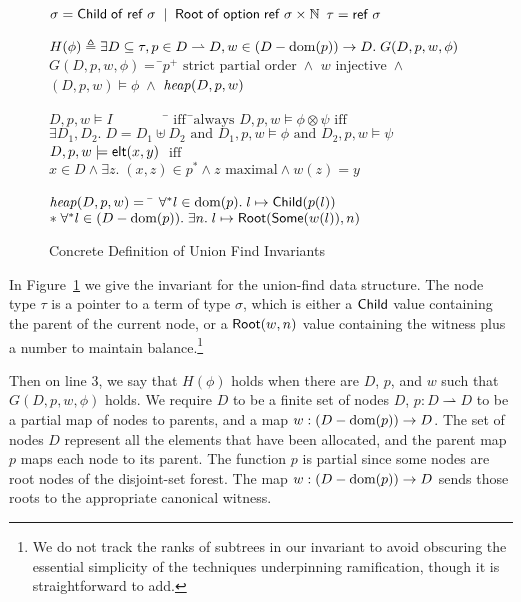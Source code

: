 \begin{figure}
\mbox{}
\begin{specification}
\nextline $\sigma = \mathsf{Child} \;\mathsf{of}\; \mathsf{ref}\;\sigma \;\;|\;\; \mathsf{Root} \;\mathsf{of}\; \mathsf{option }{\;}{\mathsf{ref}\;\sigma} \times \mathbb{N}$ 
\nextline $\tau = \mathsf{ref}\;\sigma$ 

\nextline
   $H(\phi) \triangleq \exists D \subseteq \tau, p \in D \rightharpoonup D, w \in (D-\mbox{dom}({p})) \to D.\;G(D,p,w,\phi)$
\nextline[1em] $G(D, p, w, \phi) =\;$\=$p^{+} \mbox{ strict partial order} \;\land$ 
\nextline \> $w \mbox{ injective} \;\land$ 
\nextline \> $(D, p, w) \models \phi \;\land$
\nextline \> $\mathit{heap}(D, p, w)$ 

\nextline[1em] $D, p, w \models I \qquad\qquad$\=$\mbox{ iff}\;\;$\=$\mbox{always}$ 
\nextline      $D, p, w \models \phi \otimes \psi$\>$\mbox{ iff}$\>$
                     \exists D_1, D_2.\; D = D_1 \uplus D_2 \mbox{ and } D_1, p, w \models \phi \mbox{ and } 
                     D_2, p, w \models \psi$
\nextline      $D, p, w \models \mathsf{elt}({x}, {y})$ \> $\mbox{ iff }$\>$x \in D \land \exists z.\;(x,z) \in p^* \land z\mbox{ maximal} \land w(z) = y$

\nextline[1em] $\mathit{heap}(D, p, w) = \;\;$\=
    $\forall^{*} l \in \mbox{dom}({p}).\; l \mapsto \mathsf{Child}(p(l))$ 
\nextline\>  $* \; \forall^{*} l \in (D - \mbox{dom}({p})).\; \exists n.\;l \mapsto \mathsf{Root}(\mathsf{Some}(w(l)), n)$ 
\end{specification}
\caption{Concrete Definition of Union Find Invariants}
\label{union-find:invariant}
\end{figure}
 
In Figure~\ref{union-find:invariant} we give the invariant for the
union-find data structure. The node type $\tau$ is a pointer to a 
term of type $\sigma$, which is either a $\mathsf{Child}$ value containing
the parent of the current node, or a $\mathsf{Root}(w, n)$ value containing
the witness plus a number to maintain balance.\footnote{We do not track the
ranks of subtrees in our invariant to avoid obscuring the essential
simplicity of the techniques underpinning ramification, though it is
straightforward to add.}

Then on line 3, we say that $H(\phi)$ holds when there are $D$, $p$, and
$w$ such that $G(D, p, w, \phi)$ holds. We require $D$ to be a finite set of
nodes $D$, $p : D \rightharpoonup D$ to be a partial map of nodes to parents, and a 
map $w : (D - \mbox{dom}({p})) \to D$. The set of nodes $D$ represent all the elements that have
been allocated, and the parent map $p$ maps each node to its
parent. The function $p$ is partial since some nodes are root nodes of
the disjoint-set forest. The map $w : (D - \mbox{dom}({p})) \to D$ sends
those roots to the appropriate canonical witness.

